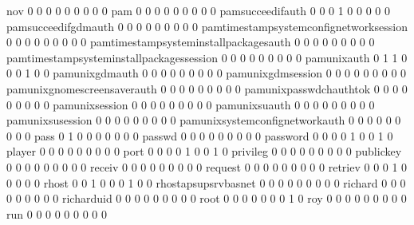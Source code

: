\documentclass[compress,8pt]{beamer}
\begin{document}
\begin{frame}
\begin{Schunk}
  nov                                        0   0   0   0   0   0   0   0   0
  pam                                        0   0   0   0   0   0   0   0   0
  pamsucceedifauth                           0   0   0   1   0   0   0   0   0
  pamsucceedifgdmauth                        0   0   0   0   0   0   0   0   0
  pamtimestampsystemconfignetworksession     0   0   0   0   0   0   0   0   0
  pamtimestampsysteminstallpackagesauth      0   0   0   0   0   0   0   0   0
  pamtimestampsysteminstallpackagessession   0   0   0   0   0   0   0   0   0
  pamunixauth                                0   1   1   0   0   0   1   0   0
  pamunixgdmauth                             0   0   0   0   0   0   0   0   0
  pamunixgdmsession                          0   0   0   0   0   0   0   0   0
  pamunixgnomescreensaverauth                0   0   0   0   0   0   0   0   0
  pamunixpasswdchauthtok                     0   0   0   0   0   0   0   0   0
  pamunixsession                             0   0   0   0   0   0   0   0   0
  pamunixsuauth                              0   0   0   0   0   0   0   0   0
  pamunixsusession                           0   0   0   0   0   0   0   0   0
  pamunixsystemconfignetworkauth             0   0   0   0   0   0   0   0   0
  pass                                       0   1   0   0   0   0   0   0   0
  passwd                                     0   0   0   0   0   0   0   0   0
  password                                   0   0   0   0   1   0   0   1   0
  player                                     0   0   0   0   0   0   0   0   0
  port                                       0   0   0   0   1   0   0   1   0
  privileg                                   0   0   0   0   0   0   0   0   0
  publickey                                  0   0   0   0   0   0   0   0   0
  receiv                                     0   0   0   0   0   0   0   0   0
  request                                    0   0   0   0   0   0   0   0   0
  retriev                                    0   0   0   1   0   0   0   0   0
  rhost                                      0   0   1   0   0   0   1   0   0
  rhostapsupsrvbasnet                        0   0   0   0   0   0   0   0   0
  richard                                    0   0   0   0   0   0   0   0   0
  richarduid                                 0   0   0   0   0   0   0   0   0
  root                                       0   0   0   0   0   0   0   1   0
  roy                                        0   0   0   0   0   0   0   0   0
  run                                        0   0   0   0   0   0   0   0   0

\end{Schunk}
\end{frame}
\end{document}

